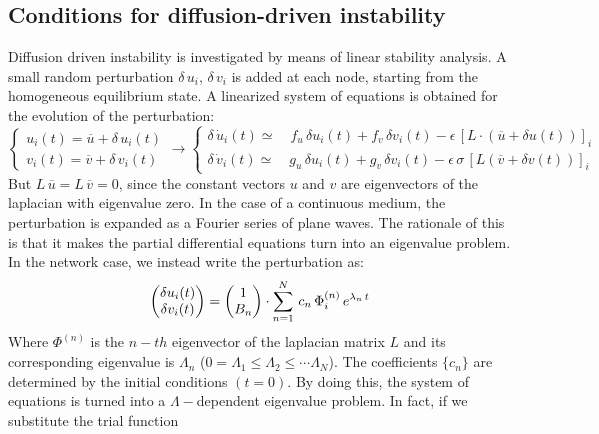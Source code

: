 \subsection*{Conditions for diffusion-driven instability}
\label{section:conditions_for_instability}
{ \small
Diffusion driven instability is investigated by means of linear stability analysis. A small random perturbation $\delta\,u_i,\, \delta\,v_i$ is added at each node, starting from the homogeneous equilibrium state. A linearized system of equations is obtained for the evolution of the perturbation:
\begin{equation*}
    \begin{cases}
    u_i(t) = \overline{u} + \delta\, u_i(t)\\
    v_i(t) = \overline{v} + \delta\, v_i(t)
    \end{cases}
    \rightarrow 
    \begin{cases}
    \delta\, \dot{u}_i(t) \simeq \quad     f_u\, \delta u_i(t) +  f_v\, \delta v_i(t) - \epsilon\,[L\cdot (\overline{u}+ \delta u(t))]_i\\
    \delta\, \dot{v}_i(t) \simeq \quad 
    g_u \, \delta u_i(t) +  g_v \, \delta v_i(t) - \epsilon\,\sigma\,[L(\overline{v}+ \delta v(t))]_i
    \end{cases}
\end{equation*}
But $L\,\overline{u} = L\,\overline{v} = 0$, since the constant vectors $u$ and $v$ are eigenvectors of the laplacian with eigenvalue zero.
In the case of a continuous medium, the perturbation is expanded as a Fourier series of plane waves. The rationale of this is that it makes the partial differential equations turn into an eigenvalue problem.
In the network case, we instead write the perturbation as:
\begin{equation*}
    \begin{pmatrix}
    \delta u_i (t) \\
    \delta v_i (t) \\
    \end{pmatrix}
    =
    \begin{pmatrix}
        1 \\
        B_n \\
    \end{pmatrix}
    \cdot \sum_{n=1}^{N}\, c_n\,\Phi_i^{(n)}\, e^{\lambda_n\,t} \\
\end{equation*}
Where $\Phi^{(n)}$ is the $n-th$ eigenvector of the laplacian matrix $L$ and its corresponding eigenvalue is $\Lambda_n$ ($0=\Lambda_1 \leq \Lambda_2 \leq \cdots \Lambda_N$). The coefficients $\{c_n\}$ are determined by the initial conditions $(t=0)$. By doing this, the system of equations is turned into a $\Lambda -$dependent eigenvalue problem. In fact, if we substitute the trial function
}
